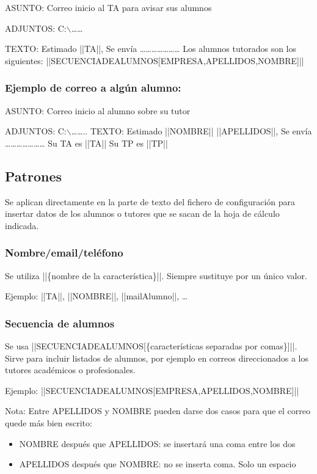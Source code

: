 \documentclass[11pt]{article}
\begin{document}
ASUNTO: Correo inicio al TA para avisar sus alumnos

ADJUNTOS: C:$\backslash$\ldots{}\ldots{}

TEXTO: Estimado ||TA||,
Se envía \ldots{}\ldots{}\ldots{}\ldots{}\ldots{}\ldots{}\ldots{}
Los alumnos tutorados son los siguientes: ||SECUENCIADEALUMNOS[EMPRESA,APELLIDOS,NOMBRE]||

\subsubsection{Ejemplo de correo a algún alumno:}
\label{sec-4-1-2}

ASUNTO: Correo inicio al alumno sobre su tutor

ADJUNTOS: C:$\backslash$\ldots{}\ldots{}..
TEXTO: Estimado ||NOMBRE|| ||APELLIDOS||,
Se envía \ldots{}\ldots{}\ldots{}\ldots{}\ldots{}\ldots{}\ldots{}
Su TA es ||TA||
Su TP es ||TP||


\subsection{Patrones}
\label{sec-4-2}
Se aplican directamente en la parte de texto del fichero de configuración para insertar datos de los alumnos o tutores que se sacan de la hoja de cálculo indicada.
\subsubsection{Nombre/email/teléfono}
\label{sec-4-2-1}
Se utiliza ||\{nombre de la característica\}||. Siempre sustituye por un único valor.

Ejemplo: ||TA||, ||NOMBRE||, ||mailAlumno||, \ldots{}
\subsubsection{Secuencia de alumnos}
\label{sec-4-2-2}
Se usa ||SECUENCIADEALUMNOS[\{características separadas por comas\}]||. Sirve para incluir listados de alumnos, por ejemplo en correos direccionados a los tutores académicos o profesionales.

Ejemplo: ||SECUENCIADEALUMNOS[EMPRESA,APELLIDOS,NOMBRE]||

Nota: Entre APELLIDOS y NOMBRE pueden darse dos casos para que el correo quede más bien escrito:
\begin{itemize}
\item NOMBRE después que APELLIDOS: se insertará una coma entre los dos
\item APELLIDOS después que NOMBRE: no se inserta coma. Solo un espacio
\end{itemize}
\end{document}
